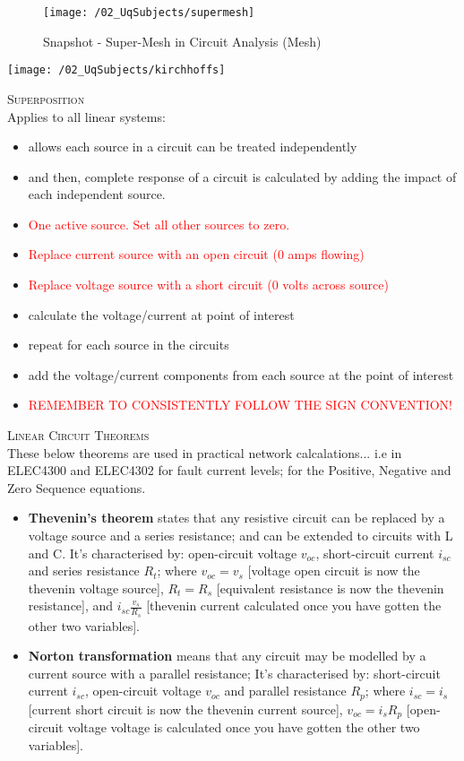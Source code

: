 \begin{figure}
  \texttt{[image: /02\_UqSubjects/supermesh]}
  \caption{Snapshot - Super-Mesh in Circuit Analysis (Mesh)}
  \label{fig_supermesh_image}
\end{figure}

\texttt{[image: /02\_UqSubjects/kirchhoffs]}

\textsc{\large Superposition}\\
Applies to all linear systems:
\begin{itemize}
  \item allows each source in a circuit can be treated independently
  \item and then, complete response of a circuit is calculated by adding the impact of each independent source.
  \item \textcolor{red}{One active source. Set all other sources to zero.}
  \item \textcolor{red}{Replace current source with an open circuit (0 amps flowing)}
  \item \textcolor{red}{Replace voltage source with a short circuit (0 volts across source)}
  \item calculate the voltage/current at point of interest
  \item repeat for each source in the circuits
  \item add the voltage/current components from each source at the point of interest
  \item \textcolor{red}{REMEMBER TO CONSISTENTLY FOLLOW THE SIGN CONVENTION!}
\end{itemize}

\textsc{\large Linear Circuit Theorems}\\
These below theorems are used in practical network calcalations... i.e in ELEC4300 and ELEC4302 for fault current levels; for the Positive, Negative and Zero Sequence equations.
\begin{itemize}
  \item \textbf{Thevenin's theorem} states that any resistive circuit can be replaced by a voltage source and a series resistance; and can be extended to circuits with L and C. It's characterised by: open-circuit voltage $v_{oc}$, short-circuit current $i_{sc}$ and series resistance $R_t$; where $v_{oc} = v_s$ [voltage open circuit is now the thevenin voltage source], $R_t = R_s$ [equivalent resistance is now the thevenin resistance], and $i_{sc} \frac{v_s}{R_s}$ [thevenin current calculated once you have gotten the other two variables].
  \item \textbf{Norton transformation} means that any circuit may be modelled by a current source with a parallel resistance; It's characterised by: short-circuit current $i_{sc}$, open-circuit voltage $v_{oc}$ and parallel resistance $R_p$; where $i_{sc} = i_s$ [current short circuit is now the thevenin current source], $v_{oc} = i_s R_p$ [open-circuit voltage voltage is calculated once you have gotten the other two variables].
\end{itemize}

